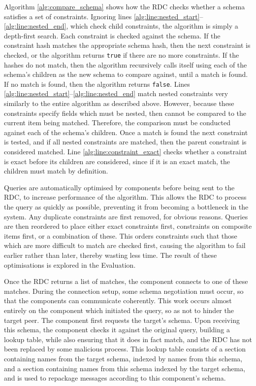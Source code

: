 \documentclass[12pt,twoside,notitlepage]{report}
\begin{document}
Algorithm \ref{alg:compare_schema} shows how the RDC checks whether a schema satisfies a set of constraints. 
Ignoring lines \ref{alg:line:nested_start}--\ref{alg:line:nested_end}, which check child constraints, the algorithm is simply a depth-first search. 
Each constraint is checked against the schema. 
If the constraint hash matches the appropriate schema hash, then the next constraint is checked, or the algorithm returns {\tt true} if there are no more constraints. 
If the hashes do not match, then the algorithm recursively calls itself using each of the schema's children as the new schema to compare against, until a match is found. 
If no match is found, then the algorithm returns {\tt false}. 
Lines \ref{alg:line:nested_start}--\ref{alg:line:nested_end} match nested constraints very similarly to the entire algorithm as described above. 
However, because these constraints specify fields which must be nested, then cannot be compared to the current item being matched. 
Therefore, the comparison must be conducted against each of the schema's children. 
Once a match is found the next constraint is tested, and if all nested constraints are matched, then the parent constraint is considered matched. 
Line \ref{alg:line:constraint_exact} checks whether a constraint is exact before its children are considered, since if it is an exact match, the children must match by definition. 

Queries are automatically optimised by components before being sent to the RDC, to increase performance of the algorithm. This allows the RDC to process the query as quickly as possible, preventing it from becoming a bottleneck in the system. 
Any duplicate constraints are first removed, for obvious reasons. 
Queries are then reordered to place either exact constraints first, constraints on composite items first, or a combination of these. 
This orders constraints such that those which are more difficult to match are checked first, causing the algorithm to fail earlier rather than later, thereby wasting less time. 
The result of these optimisations is explored in the Evaluation. 



Once the RDC returns a list of matches, the component connects to one of these matches. 
During the connection setup, some schema negotiation must occur, so that the components can communicate coherently. 
This work occurs almost entirely on the component which initiated the query, so as not to hinder the target peer. 
The component first requests the target's schema. 
Upon receiving this schema, the component checks it against the original query, building a lookup table, while also ensuring that it does in fact match, and the RDC has not been replaced by some malicious process. 
This lookup table consists of a section containing names from the target schema, indexed by names from this schema, and a section containing names from this schema indexed by the target schema, and is used to repackage messages according to this component's schema. 
\end{document}

